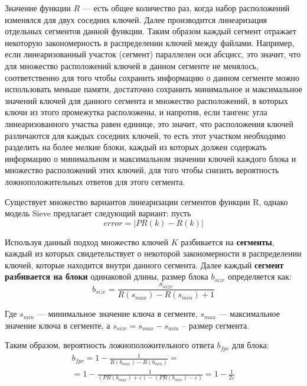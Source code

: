 Значение функции $R$ --- есть общее количество раз, когда набор расположений изменялся для двух соседних ключей. Далее производится линеаризация отдельных сегментов данной функции. Таким образом каждый сегмент отражает некоторую закономерность в распределении ключей между файлами. Например, если линеаризованный участок (сегмент) параллелен оси абсцисс, это значит, что для множество расположений ключей в данном сегменте не менялось, соответственно для того чтобы сохранить информацию о данном сегменте можно использовать меньше памяти, достаточно сохранить минимальное и максимальное значений ключей для данного сегмента и множество расположений, в которых ключи из этого промежутка расположены, и напротив, если тангенс угла линеаризованного участка равен единице, это значит, что расположения ключей различаются для каждых соседних ключей, то есть этот участком необходимо разделить на более мелкие блоки, каждый из которых должен содержать информацию о минимальном и максимальном значении ключей каждого блока и множество расположений этих ключей, для того чтобы снизить вероятность ложноположительных ответов для этого сегмента.

Существует множество вариантов линеаризации сегментов функции R, однако модель Sieve предлагает следующий вариант: пусть  
\begin{equation}\label{error}
    error = |PR(k) - R(k)|
\end{equation}


Используя данный подход множество ключей $K$ разбивается на \textbf{сегменты}, каждый из которых свидетельствует о некоторой закономерности в распределении ключей, которые находится внутри данного сегмента. Далее каждый \textbf{сегмент разбивается на блоки} одинаковой длины, размер блока $b_{size}$ определяется как:
\begin{equation}\label{partition_size}
    b_{size} = \frac{s_{size}}{R(s_{max}) - R(s_{min}) + 1}
\end{equation}

Где $s_{min}$ --- минимальное значение ключа в сегменте, $s_{max}$ --- максимальное значение ключа в сегменте, а $s_{size} = s_{max} - s_{min}$ -- размер сегмента.

Таким образом, вероятность ложноположительного ответа $b_{fpr}$ для блока:
\begin{equation}\label{partition_fpr}
    \begin{gathered}
    b_{fpr} = 1 - \frac{1}{R(b_{max}) - R(b_{min})} =\\
    = 1 - \frac{1}{(PR(b_{max}) + \varepsilon) - (PR(b_{min}) - \varepsilon)} = 1 - \frac{1}{2\varepsilon}
    \end{gathered}
\end{equation}


